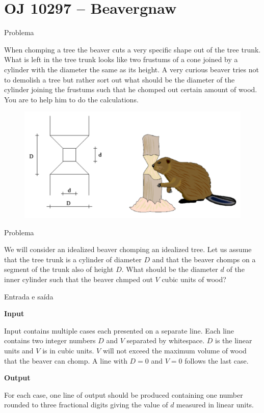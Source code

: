 \section{OJ 10297 -- Beavergnaw}

\begin{frame}[fragile]{Problema}

When chomping a tree the beaver cuts a very specific shape out of the tree trunk. What is left in
the tree trunk looks like two frustums of a cone joined by a cylinder with the diameter the same as
its height. A very curious beaver tries not to demolish a tree but rather sort out what should be the
diameter of the cylinder joining the frustums such that he chomped out certain amount of wood. You
are to help him to do the calculations.

\begin{figure}
    \centering

    \includegraphics[scale=0.5]{10297.png}
\end{figure}

\end{frame}

\begin{frame}[fragile]{Problema}

We will consider an idealized beaver chomping an idealized tree. Let us assume that the tree trunk
is a cylinder of diameter $D$ and that the beaver chomps on a segment of the trunk also of height $D$.
What should be the diameter $d$ of the inner cylinder such that the beaver chmped out $V$ cubic units of wood?

\end{frame}

\begin{frame}[fragile]{Entrada e saída}

\textbf{Input}

Input contains multiple cases each presented on a separate line. Each line contains two integer 
numbers $D$ and $V$ separated by whitespace. $D$ is the linear units and $V$ is in cubic units. 
$V$ will not exceed the maximum volume of wood that the beaver can chomp. A line with $D = 0$ and 
$V = 0$ follows the last case.

\textbf{Output}

For each case, one line of output should be produced containing one number rounded to three 
fractional digits giving the value of $d$ measured in linear units.  

\end{frame}

